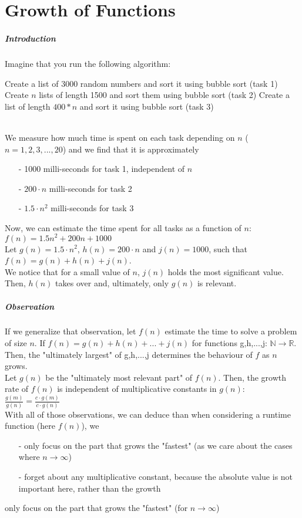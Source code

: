 \documentclass[10pt,a4paper]{book}
\newcommand{\R}{\mathbb{R}}
\newcommand{\N}{\mathbb{N}}
\newcommand{\ind}{\hspace*{\parindent}}
\begin{document}
\chapter{Growth of Functions}
\paragraph*{Introduction}
Imagine that you run the following algorithm:
\begin{algorithm}
\DontPrintSemicolon
Create a list of 3000 random numbers and sort it using bubble sort (task 1)\;
Create $n$ lists of length 1500 and sort them using bubble sort (task 2)\;
Create a list of length $400*n$ and sort it using bubble sort (task 3)
\caption{$Sort\_tasks(n: integer)$}
\end{algorithm}\\
\ind We measure how much time is spent on each task depending on $n$ ($n = 1,2,3,...,20$) and we find that it is approximately
\begin{itemize}
\item[-]1000 milli-seconds for task 1, independent of $n$
\item[-]$200\cdot n$ milli-seconds for task 2
\item[-]$1.5\cdot n^2$ milli-seconds for task 3
\end{itemize}
\ind Now, we can estimate the time spent for all tasks as a function of $n$: $f(n)=1.5n^{2}+200n+1000$\\
\ind Let $g(n)=1.5\cdot n^2$, $h(n)=200\cdot n$ and $j(n)=1000$, such that $f(n)=g(n)+h(n)+j(n)$.\\
$\ $\\
\ind We notice that for a small value of $n$, $j(n)$ holds the most significant value. Then, $h(n)$ takes over and, ultimately, only $g(n)$ is relevant.\\
\paragraph*{Observation}
\ind If we generalize that observation, let $f(n)$ estimate the time to solve a problem of size $n$. If $f(n)=g(n)+h(n)+...+j(n)$ for functions g,h,...,j: $\N \to \R$. Then, the "ultimately largest" of g,h,...,j determines the behaviour of $f$ as $n$ grows.\\
\ind Let $g(n)$ be the "ultimately most relevant part" of $f(n)$. Then, the growth rate of $f(n)$ is independent of multiplicative constants in $g(n)$:
$\frac{g(m)}{g(n)}=\frac{c\cdot g(m)}{c\cdot g(n)}$\\
\ind With all of those observations, we can deduce than when considering a runtime function (here $f(n)$), we 
\begin{itemize}
\item[-]only focus on the part that grows the "fastest" (as we care about the cases where $n \to \infty$)
\item[-]forget about any multiplicative constant, because the absolute value is not important here, rather than the growth
\end{itemize}
only focus on the part that grows the "fastest" (for $n \to \infty$)
\end{document}
